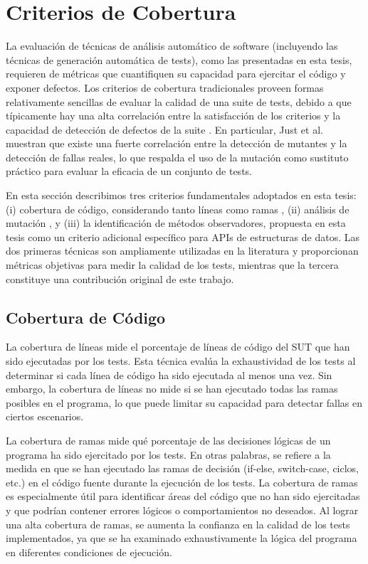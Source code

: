 \section{Criterios de Cobertura}
\label{sec:coverage}
La evaluación de técnicas de análisis automático de software (incluyendo las
técnicas de generación automática de tests), como las presentadas en esta tesis, requieren de métricas que cuantifiquen su capacidad para ejercitar el código y exponer defectos. 
Los criterios de cobertura tradicionales proveen formas relativamente sencillas de evaluar 
la calidad de una suite de tests, debido a que típicamente hay una alta correlación entre
la satisfacción de los criterios y la capacidad de detección de defectos de la
suite \cite{Ammann16,just2014mutants}. 
En particular, Just et al.~\cite{just2014mutants} muestran que existe una fuerte
correlación entre la detección de mutantes y la detección de fallas reales, lo
que respalda el uso de la mutación como sustituto práctico para evaluar la
eficacia de un conjunto de tests.

En esta sección describimos tres criterios fundamentales adoptados en esta tesis: 
(i) cobertura de código, considerando tanto líneas como ramas \cite{Ammann16,myzili2012coverage}, 
(ii) análisis de mutación \cite{jia2011analysis,Ammann16,just2014mutants}, 
y  (iii) la identificación de métodos observadores, propuesta en esta tesis como un criterio adicional
específico para APIs de estructuras de datos. 
Las dos primeras técnicas son ampliamente utilizadas en la literatura y proporcionan 
métricas objetivas para medir la calidad de los tests, mientras que la tercera constituye
una contribución original de este trabajo.

\subsection{Cobertura de Código}

La cobertura de líneas mide el porcentaje de
líneas de código del SUT que han sido ejecutadas por los tests. 
Esta técnica evalúa la exhaustividad de los tests al determinar si cada línea de código ha sido ejecutada al menos una vez. 
Sin embargo, la cobertura de líneas no mide si se han ejecutado todas las ramas
posibles en el programa, lo que puede limitar su capacidad para detectar fallas
en ciertos escenarios.

La cobertura de ramas mide qué porcentaje de las
decisiones lógicas de un programa ha sido ejercitado por los tests. En otras
palabras, se refiere a la medida en que se han ejecutado las ramas de decisión
(if-else, switch-case, ciclos, etc.) en el código fuente durante la ejecución de
los tests. La cobertura de ramas es especialmente útil para identificar áreas del 
código que no han sido ejercitadas y que podrían contener errores lógicos o comportamientos no deseados.
Al lograr una alta cobertura de ramas, se aumenta la confianza en la calidad de
los tests implementados, ya que se ha examinado exhaustivamente la lógica del programa 
en diferentes condiciones de ejecución.

